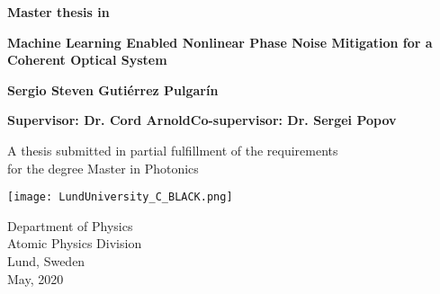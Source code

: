 
\setcounter{page}{1}

\newpage



\thispagestyle{empty}
\begin{center}
   \vspace*{1cm}
  {\large \textbf{Master thesis in  }}

  \vspace*{0.5cm}
  {\LARGE \bf\noindent \textbf{Machine Learning Enabled Nonlinear Phase Noise Mitigation for a Coherent Optical System  }}

  \vspace*{1cm}
  {\large\bf Sergio Steven Guti\'errez Pulgar\'in}
  
  \vspace*{0.30cm}
	{\normalsize \bf Supervisor: Dr. Cord Arnold\hfill   Co-supervisor: Dr. Sergei Popov}
	
  \vfill

  {\large A thesis submitted in partial fulfillment of the requirements\\
  [1mm] for the degree Master in Photonics}
  \vspace*{0.9cm}
  
   \texttt{[image: LundUniversity\_C\_BLACK.png]}

  {\large Department of Physics \\
          [-1mm] Atomic Physics Division\\
          [-1mm] Lund, Sweden\\
          [1mm]  May, 2020}
%          
%	
%	


\end{center}

